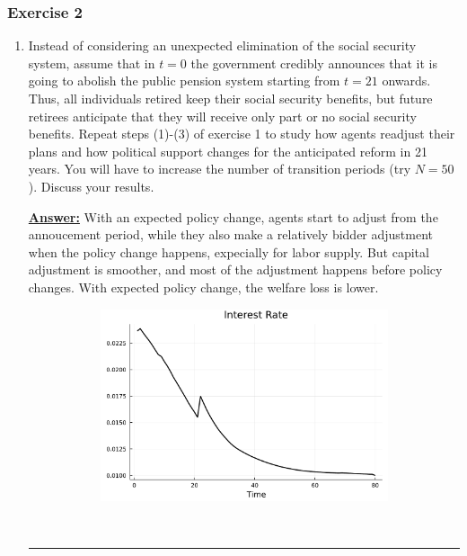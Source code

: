 \documentclass{article} %
\theoremstyle{definition}
\newenvironment{solution}[1][Answer]{\begin{singlespace}\underline{\textbf{#1:}}\quad }{\ \rule{0.3em}{0.3em}\end{singlespace}} %
\begin{document}
\subsubsection*{Exercise 2}
\begin{enumerate}
\item Instead of considering an unexpected elimination of the social security system, assume that in $ t = 0 $ the government credibly announces that it is going to abolish the public pension system starting from $ t = 21 $ onwards. Thus, all individuals retired keep their social security benefits, but future retirees anticipate that they will receive only part or no social security benefits. Repeat steps (1)-(3) of exercise 1 to study how agents readjust their plans and how political support changes for the anticipated reform in 21 years. You will have to increase the number of transition periods (try $ N = 50 $). Discuss your results.
  \begin{solution}
    With an expected policy change, agents start to adjust from the annoucement period, while they also make a relatively bidder adjustment when the policy change happens, expecially for labor supply. But capital adjustment is smoother, and most of the adjustment happens before policy changes.
    With expected policy change, the welfare loss is lower. 
    \begin{figure}
      \centering
      \begin{subfigure}[b]{0.475\textwidth}
        \centering
        \includegraphics[width=\textwidth]{Figures/interest_rate_ex2.pdf}
      \end{subfigure}
      \hfill
      \begin{subfigure}[b]{0.475\textwidth}  
        \centering 

\end{subfigure}
\end{figure}
\end{solution}
\end{enumerate}
\end{document}
